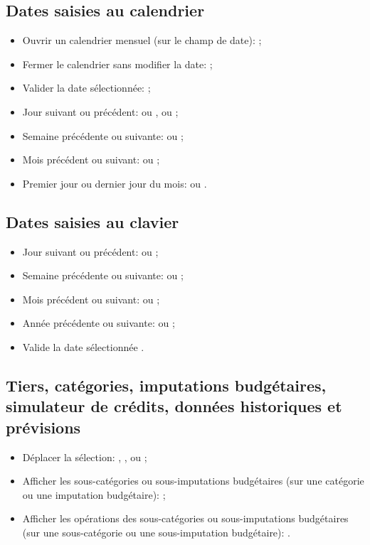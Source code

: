 \subsection{Dates saisies au calendrier}

\begin{itemize}
	\item Ouvrir un calendrier mensuel (sur le champ de date): ;
	\item Fermer le calendrier sans modifier la date: ;
	\item Valider la date sélectionnée: ;
	\item Jour suivant ou précédent: \keys{{+}} ou \keys{{-}}, \keys{\arrowkeyright} ou \keys{\arrowkeyleft};
	\item Semaine précédente ou suivante: \keys{\arrowkeyup} ou \keys{\arrowkeydown};
	\item Mois précédent ou suivant:  ou ;
	\item Premier jour ou dernier jour du mois:  ou .
\end{itemize}


\subsection{Dates saisies au clavier}

\begin{itemize}
	\item Jour suivant ou précédent: \keys{{+}} ou \keys{{-}};
	\item Semaine précédente ou suivante:  ou ;
	\item Mois précédent ou suivant:  ou ;
	\item Année précédente ou suivante:  ou ;
	\item Valide la date sélectionnée .
\end{itemize}


\subsection{Tiers, catégories, imputations budgétaires, simulateur de crédits, données historiques et prévisions}

\begin{itemize}
	\item Déplacer la sélection: \keys{\arrowkeyup}, \keys{\arrowkeydown},  ou ;
	\item Afficher les sous-catégories ou sous-imputations budgétaires (sur une catégorie ou une imputation budgétaire): \keys{{+}};
	\item Afficher les opérations des sous-catégories ou sous-imputations budgétaires (sur une sous-catégorie ou une sous-imputation budgétaire): .
\end{itemize}


